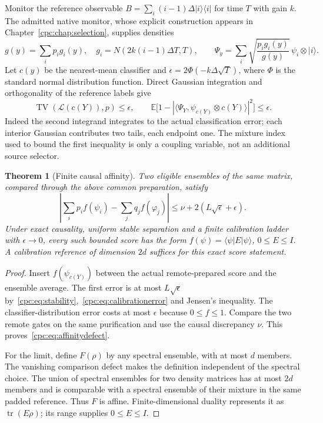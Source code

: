 \documentclass[11pt,oneside,openany]{book}
\newtheorem{theorem}{Theorem}[chapter]
\theoremstyle{definition}
\theoremstyle{remark}\newtheorem{remark}[theorem]{Remark}
\begin{document}
Monitor the reference observable $B=\sum_i(i-1)\Delta|i\rangle\langle i|$ for time $T$ with gain $k$. The admitted native monitor, whose explicit construction appears in Chapter~\ref{cpc:chap:selection}, supplies densities
\begin{equation}
 g(y)=\sum_i p_i g_i(y),\quad g_i=N(2k(i-1)\Delta T,T),\qquad
 \Psi_y=\sum_i\sqrt{\frac{p_i g_i(y)}{g(y)}}\,\psi_i\otimes|i\rangle.
 \label{cpc:eq:finitecalibration}
\end{equation}
Let $c(y)$ be the nearest-mean classifier and $\epsilon=2\Phi(-k\Delta\sqrt T)$, where $\Phi$ is the standard normal distribution function. Direct Gaussian integration and orthogonality of the reference labels give
\begin{equation}
 \operatorname{TV}(\mathcal L(c(Y)),p)\le\epsilon,\qquad
 \mathbb E\bigl[1-|\langle\Psi_Y,\psi_{c(Y)}\otimes c(Y)\rangle|^2\bigr]\le\epsilon.
 \label{cpc:eq:calibrationerror}
\end{equation}
Indeed the second integrand integrates to the actual classification error; each interior Gaussian contributes two tails, each endpoint one. The mixture index used to bound the first inequality is only a coupling variable, not an additional source selector.

\begin{theorem}[Finite causal affinity]
\label{cpc:thm:affinity}
Two eligible ensembles of the same matrix, compared through the above common preparation, satisfy
\begin{equation}
 \left|\sum_i p_i f(\psi_i)-\sum_j q_j f(\varphi_j)\right|
 \le \nu+2(L\sqrt\epsilon+\epsilon).
 \label{cpc:eq:affinitydefect}
\end{equation}
Under exact causality, uniform stable separation and a finite calibration ladder with $\epsilon\to0$, every such bounded score has the form
$f(\psi)=\langle\psi|E|\psi\rangle$, $0\le E\le I$. A calibration reference of dimension $2d$ suffices for this exact score statement.
\end{theorem}
\begin{proof}
Insert $f(\psi_{c(Y)})$ between the actual remote-prepared score and the ensemble average. The first error is at most $L\sqrt\epsilon$ by~\eqref{cpc:eq:stability},~\eqref{cpc:eq:calibrationerror} and Jensen's inequality. The classifier-distribution error costs at most $\epsilon$ because $0\le f\le1$. Compare the two remote gates on the same purification and use the causal discrepancy $\nu$. This proves~\eqref{cpc:eq:affinitydefect}.

For the limit, define $F(\rho)$ by any spectral ensemble, with at most $d$ members. The vanishing comparison defect makes the definition independent of the spectral choice. The union of spectral ensembles for two density matrices has at most $2d$ members and is comparable with a spectral ensemble of their mixture in the same padded reference. Thus $F$ is affine. Finite-dimensional duality represents it as $\operatorname{tr}(E\rho)$; its range supplies $0\le E\le I$.
\end{proof}
\end{document}
